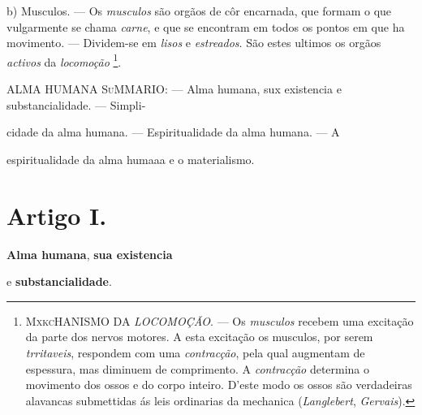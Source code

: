 b) Musculos. --- Os \emph{musculos} são orgãos de côr encarnada, que formam o que vulgarmente se chama \emph{carne}, e que se encontram em todos os pontos em que ha movimento. --- Dividem-se em \emph{lisos} e \emph{estreados}. São estes ultimos os orgãos \emph{activos} da \emph{locomoção} \footnote{\textsc{MxkcHANISMO} DA \emph{LOCOMOÇÃO}. --- Os \emph{musculos} recebem uma excitação da parte dos nervos motores. A esta excitação os musculos, por serem \emph{trritaveis}, respondem com uma \emph{contracção}, pela qual augmentam de espessura, mas diminuem de comprimento. A \emph{contracção} determina o movimento dos ossos e do corpo inteiro. D'este modo os ossos são verdadeiras alavancas submettidas ás leis ordinarias da mechanica (\emph{Langlebert}, \emph{Gervais}).}.

ALMA HUMANA \textsc{SuMMARIO}: --- Alma humana, sux existencia e substancialidade. --- Simpli-

cidade da alma humana. --- Espiritualidade da alma humana. --- A

espiritualidade da alma humaaa e o materialismo.


\section*{Artigo I.}

 \textbf{Alma humana}, \textbf{sua existencia}

e \textbf{substancialidade}.


